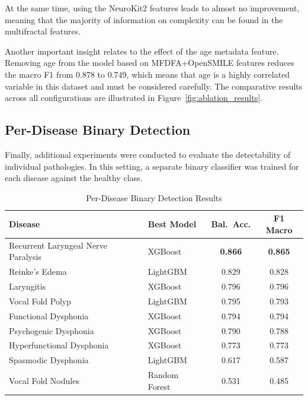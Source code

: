 \documentclass[conference]{IEEEtran}
\begin{document}
At the same time, using the NeuroKit2 features leads to almost no improvement, meaning that the majority of information on complexity can be found in the multifractal features.

Another important insight relates to the effect of the age metadata feature. Removing age from the model based on MFDFA+OpenSMILE features reduces the macro F1 from 0.878 to 0.749, which means that age is a highly correlated variable in this dataset and must be considered carefully. The comparative results across all configurations are illustrated in Figure~\ref{fig:ablation_results}.

  \subsection{Per-Disease Binary Detection}

  Finally, additional experiments were conducted to evaluate the detectability of individual pathologies. In this setting, a separate binary classifier was trained for each disease against the healthy class.

  \begin{table}[htbp]
  \centering
  \caption{Per-Disease Binary Detection Results}
  \label{tab:per_disease}
  \begin{tabular}{p{3.2cm} p{2cm} c c}
  \toprule
  \textbf{Disease} & \textbf{Best Model} & \textbf{Bal.\ Acc.} & \textbf{F1 Macro} \\
  \midrule
  Recurrent Laryngeal Nerve Paralysis & XGBoost & \textbf{0.866} & \textbf{0.865} \\
  Reinke's Edema & LightGBM & 0.829 & 0.828 \\
  Laryngitis & XGBoost & 0.796 & 0.796 \\
  Vocal Fold Polyp & LightGBM & 0.795 & 0.793 \\
  Functional Dysphonia & XGBoost & 0.794 & 0.794 \\
  Psychogenic Dysphonia & XGBoost & 0.790 & 0.788 \\
  Hyperfunctional Dysphonia & XGBoost & 0.773 & 0.773 \\
  Spasmodic Dysphonia & LightGBM & 0.617 & 0.587 \\
  Vocal Fold Nodules & Random Forest & 0.531 & 0.485 \\
  \bottomrule
  \end{tabular}
  \end{table}
\end{document}
